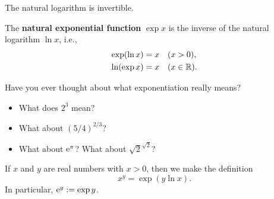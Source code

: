 

\begin{theorem}
The natural logarithm is invertible.
\end{theorem}
\begin{definition}
The \textbf{natural exponential function} $\exp x $ is the inverse of the natural logarithm $\ln x$, i.e.,
\begin{align*}
\exp(\ln x) &= x \quad (x>0),\\
\ln (\exp x) &= x \quad (x\in\mathbb R).
\end{align*}
\end{definition}


\begin{remark}
Have you ever thought about what exponentiation really means?
\begin{itemize}
\item What does $2^3$ mean?

\ifdefined\SOLUTION
{}
\else
\vspace{1in}
\fi

\item What about $(5/4)^{2/3}$?
\ifdefined\SOLUTION
{}
\else
\vspace{1in}
\fi

\item What about $\mathrm{e}^\pi$? What about ${\sqrt 2}^{\sqrt 2}$?
\ifdefined\SOLUTION
{}
\else
\vspace{1in}
\fi
\end{itemize}
\end{remark}

\newpage

\begin{definition}
If $x$ and $y$ are real numbers with $x>0$, then we make the definition
\begin{equation*}
x^y = \exp(y\ln x).
\end{equation*}
In particular, $\mathrm{e}^y := \exp y$.
\end{definition}

